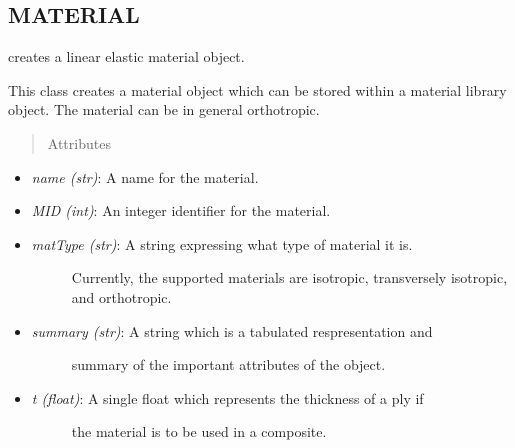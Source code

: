 \documentclass[letterpaper,10pt,english]{sphinxmanual}
\begin{document}
\subsection{MATERIAL}
\label{structures:material}

\begin{fulllineitems}
\label{structures:AeroComBAT.Structures.Material}
creates a linear elastic material object.

This class creates a material object which can be stored within a
material library object. The material can be in general orthotropic.
\begin{quote}\begin{description}
\item[{Attributes}] \leavevmode
\end{description}\end{quote}
\begin{itemize}
\item {} 
\emph{name (str)}: A name for the material.

\item {} 
\emph{MID (int)}: An integer identifier for the material.

\item {} \begin{description}
\item[{\emph{matType (str)}: A string expressing what type of material it is.}] \leavevmode
Currently, the supported materials are isotropic, transversely
isotropic, and orthotropic.

\end{description}

\item {} \begin{description}
\item[{\emph{summary (str)}: A string which is a tabulated respresentation and}] \leavevmode
summary of the important attributes of the object.

\end{description}

\item {} \begin{description}
\item[{\emph{t (float)}: A single float which represents the thickness of a ply if}] \leavevmode
the material is to be used in a composite.


\end{description}
\end{itemize}
\end{fulllineitems}
\end{document}
